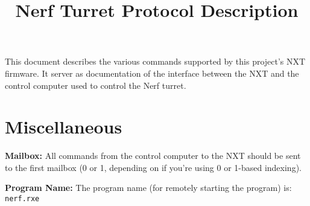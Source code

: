 \documentclass{article}
\title{Nerf Turret Protocol Description}
\author{}
\date{}
\begin{document}
	\maketitle

	This document describes the various commands supported by this project's NXT firmware.
	It server as documentation of the interface between the NXT and the control computer used to control the Nerf turret.

	\section{Miscellaneous}
	\textbf{Mailbox:} All commands from the control computer to the NXT should be sent to the first mailbox (0 or 1, depending on if you're using 0 or 1-based indexing).

	\noindent
	\textbf{Program Name:} The program name (for remotely starting the program) is: \texttt{nerf.rxe}
\end{document}
